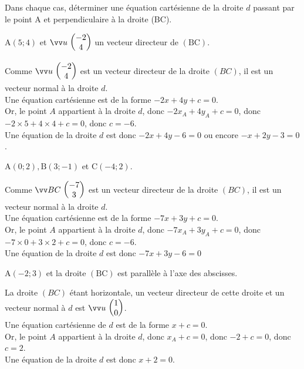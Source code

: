 \documentclass[12pt,a4paper]{article}  %
\begin{document}
Dans chaque cas, déterminer une équation cartésienne de la droite $d$ passant par le point $\mathrm{A}$ et perpendiculaire à la droite (BC).
\begin{enumMet}
    \item {} $\mathrm{A}(5 ; 4)$ et $\Coord{u}{-2}{4}$ un vecteur directeur de $(\mathrm{BC})$.\\
    \begin{corrBox}
    	Comme $\Coord{u}{-2}{4}$ est un vecteur directeur de la droite $(B C)$, il est un vecteur normal à la droite $d$.\\
    	Une équation cartésienne est de la forme $-2x+4 y+c=0$.\\
    	Or, le point $A$ appartient à la droite $d$, donc $-2x_{A}+4y_{A}+c=0$, donc $-2 \times 5+4 \times 4+c=0$, donc $c=-6$.\\
    	Une équation de la droite $d$ est donc $-2 x+4 y-6=0$ ou encore $-x+2y-3=0$.
    \end{corrBox}
    \item $\mathrm{A}(0 ; 2), \mathrm{B}(3 ;-1)$ et $\mathrm{C}(-4 ; 2)$.\\
    \begin{corrBox}
    	Comme $\Coord{BC}{-7}{3}$  est un vecteur directeur de la droite $(B C)$, il est un vecteur normal à la droite $d$.\\
    	Une équation cartésienne est de la forme $-7 x+3y+c=0$.\\
    	Or, le point $A$ appartient à la droite $d$, donc $-7 x_{A}+3y_{A}+c=0$, donc $-7 \times 0+3 \times 2+c=0$, donc $c=-6$.\\
    	Une équation de la droite $d$ est donc $-7 x+3 y-6=0$        
    \end{corrBox}
    \item $\mathrm{A}(-2 ; 3)$ et la droite $(\mathrm{BC})$ est parallèle à l'axe des abscisses.\\
    \begin{corrBox}
    	La droite $(B C)$ étant horizontale, un vecteur directeur de cette droite et un vecteur normal à $d$ est $\Coord{u}{1}{0}$.\\
    	Une équation cartésienne de $d$ est de la forme $x+c=0$.\\
    	Or, le point $A$ appartient à la droite $d$, donc $x_{A}+c=0$, donc $-2+c=0$, donc $c=2$.\\
    	Une équation de la droite $d$ est donc $x+2=0$.        
    \end{corrBox}
\end{enumMet}
\end{document}

